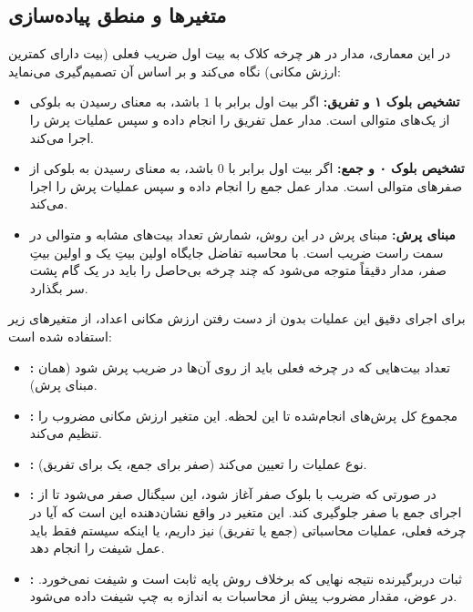 \documentclass[11pt,a4paper]{article}
\begin{document}
\subsection{متغیرها و منطق پیاده‌سازی}
در این معماری، مدار در هر چرخه کلاک به بیت اول ضریب فعلی (بیت دارای کمترین ارزش مکانی) نگاه می‌کند و بر اساس آن تصمیم‌گیری می‌نماید:
\begin{itemize}
    \item \textbf{تشخیص بلوک ۱ و تفریق:} اگر بیت اول برابر با $1$ باشد، به معنای رسیدن به بلوکی از یک‌های متوالی است. مدار عمل تفریق را انجام داده و سپس عملیات پرش را اجرا می‌کند.
    \item \textbf{تشخیص بلوک ۰ و جمع:} اگر بیت اول برابر با $0$ باشد، به معنای رسیدن به بلوکی از صفرهای متوالی است. مدار عمل جمع را انجام داده و سپس عملیات پرش را اجرا می‌کند.
    \item \textbf{مبنای پرش:} مبنای پرش در این روش، شمارش تعداد بیت‌های مشابه و متوالی در سمت راست ضریب است. با محاسبه تفاضل جایگاه اولین بیتِ یک و اولین بیتِ صفر، مدار دقیقاً متوجه می‌شود که چند چرخه بی‌حاصل را باید در یک گام پشت سر بگذارد.
\end{itemize}

برای اجرای دقیق این عملیات بدون از دست رفتن ارزش مکانی اعداد، از متغیرهای زیر استفاده شده است:
\begin{itemize}
    \item \textbf{:} تعداد بیت‌هایی که در چرخه فعلی باید از روی آن‌ها در ضریب پرش شود (همان مبنای پرش).
    \item \textbf{:} مجموع کل پرش‌های انجام‌شده تا این لحظه. این متغیر ارزش مکانی مضروب را تنظیم می‌کند.
    \item \textbf{:} نوع عملیات را تعیین می‌کند (صفر برای جمع، یک برای تفریق).
    \item \textbf{:} در صورتی که ضریب با بلوک صفر آغاز شود، این سیگنال صفر می‌شود تا از اجرای جمع با صفر جلوگیری کند. این متغیر در واقع نشان‌دهنده این است که آیا در چرخه فعلی، عملیات محاسباتی (جمع یا تفریق) نیز داریم، یا اینکه سیستم فقط باید عمل شیفت را انجام دهد.
    \item \textbf{:} ثبات دربرگیرنده نتیجه نهایی که برخلاف روش پایه ثابت است و شیفت نمی‌خورد. در عوض، مقدار مضروب پیش از محاسبات به اندازه  به چپ شیفت داده می‌شود.
\end{itemize}
\end{document}
